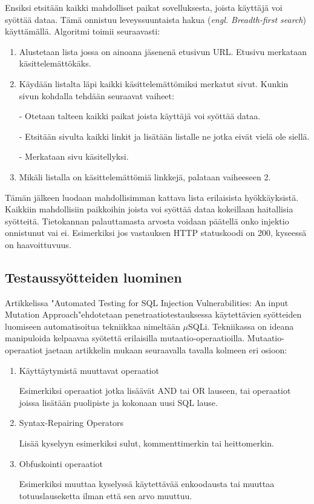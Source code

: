 \documentclass[finnish]{tktltiki2}
\theoremstyle{definition}
\theoremstyle{remark}
\begin{document}
	Ensiksi etsitään kaikki mahdolliset paikat sovelluksesta, joista käyttäjä voi syöttää dataa. Tämä onnistuu leveyssuuntaista hakua (\textit{engl. Breadth-first search}) käyttämällä. Algoritmi toimii seuraavasti:
	\begin{enumerate}
		\item Alustetaan lista jossa on ainoana jäsenenä etusivun URL. Etusivu merkataan käsittelemättökäks.
		
		\item Käydään listalta läpi kaikki käsittelemättömiksi merkatut sivut. Kunkin sivun kohdalla tehdään seuraavat vaiheet:
		
		- Otetaan talteen kaikki paikat joista käyttäjä voi syöttää dataa.
		
		- Etsitään sivulta kaikki linkit ja lisätään listalle ne jotka eivät vielä ole siellä.
		
		- Merkataan sivu käsitellyksi.
		
		\item Mikäli listalla on käsittelemättömiä linkkejä, palataan vaiheeseen 2.
	\end{enumerate}
	
	Tämän jälkeen luodaan mahdollisimman kattava lista erilaisista hyökkäyksistä. Kaikkiin mahdollisiin paikkoihin joista voi syöttää dataa kokeillaan haitallisia syötteitä. Tietokannan palauttamasta arvosta voidaan päätellä onko injektio onnistunut vai ei. Esimerkiksi jos vastauksen HTTP statuskoodi on 200, kyseessä on haavoittuvuus.
	
	\subsection{Testaussyötteiden luominen}
	Artikkelissa "Automated Testing for SQL Injection Vulnerabilities: An input Mutation Approach"\cite{generation}\space ehdotetaan penetraatiotestauksessa käytettävien syötteiden luomiseen automatisoitua tekniikkaa nimeltään $\mu$SQLi. Tekniikassa on ideana manipuloida kelpaavaa syötettä erilaisilla mutaatio-operaatioilla. Mutaatio-operaatiot jaetaan artikkelin mukaan seuraavalla tavalla kolmeen eri osioon:
	\begin{enumerate}
	\item Käyttäytymistä muuttavat operaatiot
	
	Esimerkiksi operaatiot jotka lisäävät AND tai OR lauseen, tai operaatiot joissa lisätään puolipiste ja kokonaan uusi SQL lause. 
	
	\item Syntax-Repairing Operators
	
	Lisää kyselyyn esimerkiksi sulut, kommenttimerkin tai heittomerkin.
	
	\item Obfuskointi operaatiot
	
	Esimerkiksi muuttaa kyselyssä käytettävää enkoodausta tai muuttaa totuuslauseketta ilman että sen arvo muuttuu.
	\end{enumerate}
	
\end{document}
